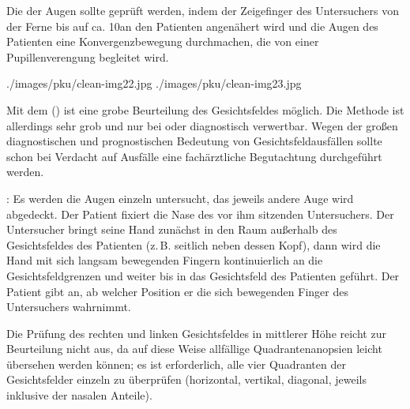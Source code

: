 
Die  der Augen sollte geprüft
werden, indem der Zeigefinger des Untersuchers von der Ferne bis auf
ca. 10\CM* an den Patienten
angenähert wird und die Augen des Patienten eine Konvergenzbewegung
durchmachen, die von einer Pupillenverengung begleitet wird.

\begin{PictureSeries}{}{}
{./images/pku/clean-img22.jpg}
{}
{./images/pku/clean-img23.jpg}
{}
{}
{}
{}
{}
\end{PictureSeries}



{Mit dem  ()
ist eine grobe Beurteilung des Gesichtsfeldes möglich. Die
Methode ist allerdings sehr grob und nur bei
 oder  diagnostisch
verwertbar. Wegen der großen diagnostischen und
prognostischen Bedeutung von Gesichtsfeldausfällen sollte
schon bei Verdacht auf Ausfälle eine fachärztliche
Begutachtung durchgeführt werden.

: Es werden die Augen einzeln untersucht, 
das jeweils andere Auge wird abgedeckt.
Der Patient fixiert die Nase des vor ihm
sitzenden Untersuchers. Der Untersucher bringt seine Hand zunächst in
den Raum außerhalb des Gesichtsfeldes des Patienten (z.\,B.
seitlich neben dessen Kopf), dann wird die Hand mit sich
langsam bewegenden Fingern kontinuierlich an die
Gesichtsfeldgrenzen und weiter bis in das Gesichtsfeld des
Patienten geführt. Der Patient gibt an, ab welcher Position
er die sich bewegenden Finger des Untersuchers
wahrnimmt.~\cite{Zeiler2001}

Die Prüfung des rechten und linken Gesichtsfeldes in
mittlerer Höhe reicht zur Beurteilung nicht aus, da auf
diese Weise allfällige Quadrantenanopsien leicht übersehen
werden können; es ist erforderlich, alle vier Quadranten der
Gesichtsfelder einzeln zu überprüfen (horizontal, vertikal,
diagonal, jeweils inklusive der nasalen Anteile).~\cite{Zeiler2001}


}{%
\begin{PkuBefunde}[]
  \item[\SymbolPkuNormal] 
  \item[\SymbolPkuPathologisch] 
\end{PkuBefunde}
}{}{}{}


